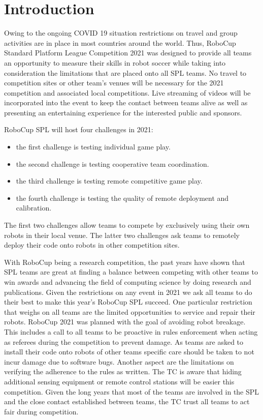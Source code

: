 \section{Introduction}

Owing to the ongoing COVID 19 situation restrictions on travel and group activities are in place in most countries around the world. Thus, RoboCup Standard Platform League Competition 2021 was designed to provide all teams an opportunity to measure their skills in robot soccer while taking into consideration the limitations that are placed onto all SPL teams. No travel to competition sites or other team's venues will be necessary for the 2021 competition and associated local competitions. Live streaming of videos will be incorporated into the event to keep the contact between teams alive as well as presenting an entertaining experience for the interested public and sponsors.

RoboCup SPL will host four challenges in 2021:

\begin{itemize}
    \item the first challenge is testing individual game play. 
    \item the second challenge is testing cooperative team coordination.
    \item the third challenge is testing remote competitive game play. 
    \item the fourth challenge is testing the quality of remote deployment and calibration.
\end{itemize}

The first two challenges allow teams to compete by exclusively using their own robots in their local venue. The latter two challenges ask teams to remotely deploy their code onto robots in other competition sites.

With RoboCup being a research competition, the past years have shown that SPL teams are great at finding a balance between competing with other teams to win awards and advancing the field of computing science by doing research and publications. Given the restrictions on any event in 2021 we ask all teams to do their best to make this year's RoboCup SPL succeed. One particular restriction that weighs on all teams are the limited opportunities to service and repair their robots. RoboCup 2021 was planned with the goal of avoiding robot breakage. This includes a call to all teams to be proactive in rules enforcement when acting as referees during the competition to prevent damage. As teams are asked to install their code onto robots of other teams specific care should be taken to not incur damage due to software bugs. Another aspect are the limitations on verifying the adherence to the rules as written. The TC is aware that hiding additional sensing equipment or remote control stations will be easier this competition. Given the long years that most of the teams are involved in the SPL and the close contact established between teams, the TC trust all teams to act fair during competition.

